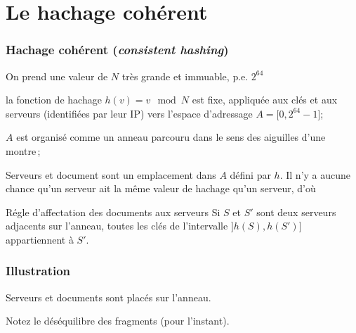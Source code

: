 \section{Le hachage cohérent}

\begin{frame}
\frametitle{Hachage cohérent (\textit{consistent hashing})}

On  prend une valeur de $N$ très grande et immuable, p.e. $2^{64}$

\begin{redbullet}
  \item la fonction de hachage  $h(v) = v \mod N $ est \alert{fixe},
    appliquée aux clés \alert{et} aux serveurs (identifiées par leur IP)
          vers l'espace d'adressage  $A=[0, 2^{64}-1$];
  \item $A$ est organisé comme un anneau parcouru dans le sens des aiguilles d'une montre\,;
\end{redbullet}

\vfill

Serveurs et document sont un emplacement dans $A$ défini par $h$.
\alert{Il n'y a \alert{aucune chance} qu'un serveur ait la même valeur de hachage qu'un 
serveur, d'où}
\vfill

\begin{remblock}{Régle d'affectation des documents aux serveurs}
Si $S$ et $S'$ sont deux serveurs adjacents sur l'anneau, toutes les clés de l'intervalle 
   $]h(S), h(S')]$ appartiennent à $S'$.
\end{remblock}
\end{frame}

\begin{frame}
\frametitle{Illustration}

Serveurs \alert{et} documents sont placés sur l'anneau.

\vfill


\vfill

Notez le déséquilibre des fragments (pour l'instant).
\end{frame}


